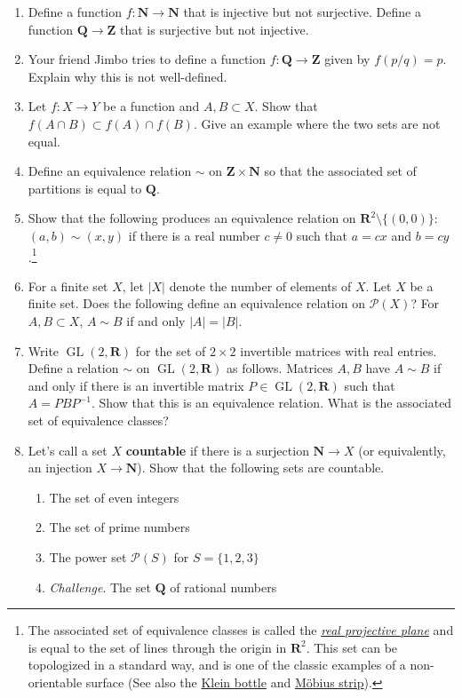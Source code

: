 \documentclass[12pt]{article}
\numberwithin{equation}{subsection}
\theoremstyle{note}
\begin{document}
\begin{enumerate}[label=\arabic*.]
	\item Define a function $f\colon\mathbf{N}\to \mathbf{N}$ that is injective but not surjective. Define a function $\mathbf{Q}\to\mathbf{Z}$ that is surjective but not injective.  
	
	\item Your friend Jimbo tries to define a function $f\colon \mathbf{Q}\to\mathbf{Z}$ given by $f(p/q)=p$. Explain why this is not well-defined. 
	
	\item Let $f\colon X\to Y$ be a function and $A,B\subset X$. Show that $f(A\cap B)\subset f(A)\cap f(B)$. Give an example where the two sets are not equal. 
	
	\item Define an equivalence relation $\sim$ on $\mathbf{Z}\times \mathbf{\mathbf{N}}$ so that the associated set of partitions is equal to $\mathbf{Q}$. 
	
	\item Show that the following produces an equivalence relation on $\mathbf{R}^2 \setminus \{ (0,0)\}$: $(a,b)\sim (x,y)$ if there is a real number $c\neq 0$ such that $a=cx$ and $b=cy$.\footnote{The associated set of equivalence classes is called the \href{https://en.wikipedia.org/wiki/Real_projective_plane}{\textit{real projective plane}} and is equal to the set of lines through the origin in $\mathbf{R}^2$. This set can be topologized in a standard way, and is one of the classic examples of a non-orientable surface (See also the \href{https://en.wikipedia.org/wiki/Klein_bottle}{Klein bottle} and \href{https://en.wikipedia.org/wiki/M\%C3\%B6bius_strip}{M\"obius strip}).}
	
	\item For a finite set $X$, let $|X|$ denote the number of elements of $X$. Let $X$ be a finite set. Does the following define an equivalence relation on $\mathcal{P}(X)$? For $A,B\subset X$, $A\sim B$ if and only $|A|=|B|$. 
	
	\item Write $\operatorname{GL}(2,\mathbf{R})$ for the set of $2\times 2$ invertible matrices with real entries. Define a relation $\sim$ on $\operatorname{GL}(2,\mathbf{R})$ as follows. Matrices $A,B$ have $A\sim B$ if and only if there is an invertible matrix $P\in \operatorname{GL}(2,\mathbf{R})$ such that $A=PBP^{-1}$. Show that this is an equivalence relation. What is the associated set of equivalence classes?
	
	\item Let's call a set $X$ \textbf{countable} if there is a surjection $\mathbf{N}\to X$ (or equivalently, an injection $X\to \mathbf{N}$). Show that the following sets are countable.
	\begin{enumerate}
		\item The set of even integers
		\item The set of prime numbers
		\item The power set $\mathcal{P}(S)$ for $S=\{1,2,3\}$
		\item \textit{Challenge}. The set $\mathbf{Q}$ of rational numbers
	\end{enumerate}
	

\end{enumerate}
\end{document}
